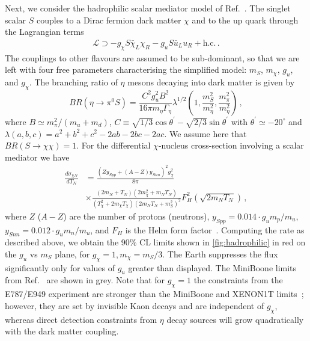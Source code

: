 \documentclass[prl,twocolumn,groupedaddress,nofootinbib, superscriptaddress]{revtex4-1}
\begin{document}
Next, we consider the hadrophilic scalar mediator model of Ref.~\cite{Batell:2018fqo}. The singlet scalar $S$ couples to a Dirac fermion dark matter $\chi$ and to the up quark through the Lagrangian terms
%
\begin{align}
\mathcal{L} \supset -g_\chi S\bar{\chi}_L \chi_R - g_u S \bar{u}_L u_R + \text{h.c.} \, .
\end{align}
%
The couplings to other flavours are assumed to be sub-dominant, so that we are left with four free parameters characterising the simplified model: $m_S$, $m_\chi$, $g_u$, and $g_\chi$. The branching ratio of $\eta$ mesons decaying into dark matter is given by 
%
\begin{equation}
BR(\eta \to \pi^0 S) = \frac{C^2 g_u^2 B^2}{16\pi m_\eta \Gamma_\eta} \lambda^{1/2}\left(1, \frac{m_S^2}{m_\eta^2}, \frac{m_\pi^2}{m_\eta^2}\right) \, ,
\end{equation}
%
where $B \simeq m_\pi^2/(m_u+m_d)$, $C \equiv \sqrt{1/3} \cos\theta^\prime -\sqrt{2/3} \sin\theta^\prime$ with $\theta^\prime \simeq -20^\circ$ and $\lambda(a,b,c) = a^2 + b^2 + c^2 -2ab - 2bc - 2ac$. We assume here that $BR(S \to \chi \chi) = 1$. For the differential $\chi$-nucleus cross-section involving a scalar mediator we have 
%
\begin{align}
\frac{d\sigma_{\chi N}}{dT_N} &= \frac{\left(Z y_{Spp} + (A-Z) y_{Snn}\right)^2 g_\chi^2}{8\pi} \nonumber \\
& \times \frac{(2m_N + T_N) (2 m_\chi^2 + m_N T_N)}{(T_\chi^2 + 2m_\chi T_\chi)(2m_N T_N + m_S^2)^2} F_H^2(\sqrt{2 m_N T_N}) \, ,
\end{align}
%
where $Z$ ($A-Z$) are the number of protons (neutrons), $y_{Spp} = 0.014 \cdot g_u m_p/m_u$, $y_{Snn} = 0.012 \cdot g_u m_n/m_u$, and $F_H$ is the Helm form factor~\cite{Duda:2006uk}. Computing the rate as described above, we obtain the 90\% CL limits shown in \cref{fig:hadrophilic} in red on the $g_u$ vs $m_S$ plane, for $g_\chi = 1, m_\chi = m_S/3$. The Earth suppresses the flux significantly only for values of $g_u$ greater than displayed. The MiniBoone limits from Ref.~\cite{Batell:2018fqo} are shown in grey. Note that for $g_\chi=1$ the constraints from the E787/E949 experiment are stronger than the MiniBoone and XENON1T limits~\cite{Batell:2018fqo}; however, they are set by invisible Kaon decays and are independent of $g_\chi$, whereas direct detection constraints from $\eta$ decay sources will grow quadratically with the dark matter coupling.  

\end{document}
